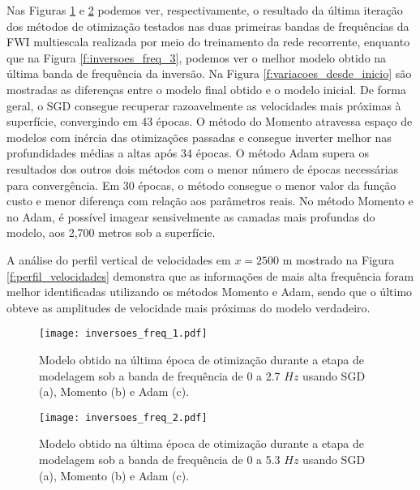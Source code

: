     Nas Figuras \ref{f:inversoes_freq_1} e \ref{f:inversoes_freq_2} podemos ver, respectivamente, o resultado da última iteração dos métodos de otimização testados nas duas primeiras bandas de frequências da FWI multiescala realizada por meio do treinamento da rede recorrente, enquanto que na Figura \ref{f:inversoes_freq_3}, podemos ver o melhor modelo obtido na última banda de frequência da inversão. Na Figura \ref{f:variacoes_desde_inicio} são mostradas as diferenças entre o modelo final obtido e o modelo inicial. De forma geral, o SGD consegue recuperar razoavelmente as velocidades mais próximas à superfície, convergindo em 43 épocas. O método do Momento atravessa espaço de modelos com inércia das otimizações passadas e consegue inverter melhor nas profundidades médias a altas após 34 épocas. O método Adam supera os resultados dos outros dois métodos com o menor número de épocas necessárias para convergência. Em 30 épocas, o método consegue o menor valor da função custo e menor diferença com relação aos parâmetros reais. No método Momento e no Adam, é possível imagear sensivelmente as camadas mais profundas do modelo, aos 2,700 metros sob a superfície.

    A análise do perfil vertical de velocidades em $x=2500$ m mostrado na Figura \ref{f:perfil_velocidades} demonstra que as informações de mais alta frequência foram melhor identificadas utilizando os métodos Momento e Adam, sendo que o último obteve as amplitudes de velocidade mais próximas do modelo verdadeiro.

    \begin{figure}
      \begin{center}
        \texttt{[image: inversoes\_freq\_1.pdf]}
      \end{center}
      \caption{Modelo obtido na última época de otimização durante a etapa de modelagem sob a banda de frequência de 0 a 2.7 $Hz$ usando SGD (a), Momento (b) e Adam (c).}
      \label{f:inversoes_freq_1}
    \end{figure}

    \begin{figure}
      \begin{center}
        \texttt{[image: inversoes\_freq\_2.pdf]}
      \end{center}
      \caption{Modelo obtido na última época de otimização durante a etapa de modelagem sob a banda de frequência de 0 a 5.3 $Hz$ usando SGD (a), Momento (b) e Adam (c).}
      \label{f:inversoes_freq_2}
    \end{figure}

